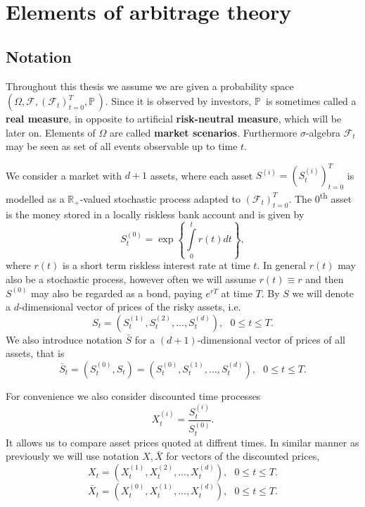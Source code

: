 \documentclass[a4paper,12pt, oneside]{book}
\theoremstyle{definition}
\theoremstyle{remark}
\def\P{{\mathbb{P}}\,}
\def\R{{\mathbb{R}}}
\def\Sa{\bar{S}}
\def\Xa{\bar{X}}
\begin{document}
\section{Elements of arbitrage theory}

\subsection{Notation}
Throughout this thesis we assume we are given a probability space $(\Omega, \mathcal{F}, (\mathcal{F}_t)_{t=0}^T, \P)$. Since it is observed by investors, $\P$ is sometimes called a \textbf{real measure}, in opposite to artificial \textbf{risk-neutral measure}, which will be later on. Elements of $\Omega$ are called \textbf{market scenarios}. Furthermore $\sigma$-algebra $\mathcal{F}_t$ may be seen as set of all events observable up to time $t$.

We consider a market with $d+1$ assets, where each asset $S^{(i)} = (S^{(i)}_t)_{t=0}^T$ is modelled as a $\R_+$-valued stochastic process adapted to $(\mathcal{F}_t)_{t=0}^T$. The $0$\textsuperscript{th} asset is the money stored in a locally riskless bank account and is given by 
\[S^{(0)}_t = \exp\left\{ \int\limits_0^t r(t)dt \right\},\]
where $r(t)$ is a short term riskless interest rate at time $t$. In general $r(t)$ may also be a stochastic process, however often we will assume $r(t) \equiv r$ and then $S^{(0)}$ may also be regarded as a bond, paying $e^{rT}$ at time $T$. By $S$ we will denote a $d$-dimensional vector of prices of the risky assets, i.e.
\begin{equation*}
 S_t = (S^{(1)}_t, S^{(2)}_t, \ldots, S^{(d)}_t), \ \ \ 0 \leq t \leq T.
\end{equation*}
We also introduce notation $\Sa$ for a $(d+1)$-dimensional vector of prices of all assets, that is
\begin{equation*}
 \Sa_t = (S^{(0)}_t, S_t) = (S^{(0)}_t, S^{(1)}_t, \ldots, S^{(d)}_t), \ \ \ 0 \leq t \leq T.
\end{equation*}

For convenience we also consider discounted time processes
\[ X^{(i)}_t = \frac{S^{(i)}_t}{S^{(0)}_t}. \]
It allows us to compare asset prices quoted at diffrent times. In similar manner as previously we will use notation $X, \Xa$ for vectors of the discounted prices,
\begin{equation*}
 X_t = (X^{(1)}_t, X^{(2)}_t, \ldots, X^{(d)}_t), \ \ \ 0 \leq t \leq T.
\end{equation*}
\begin{equation*}
 \Xa_t = (X^{(0)}_t, X^{(1)}_t, \ldots, X^{(d)}_t), \ \ \ 0 \leq t \leq T.
\end{equation*}
\end{document}
